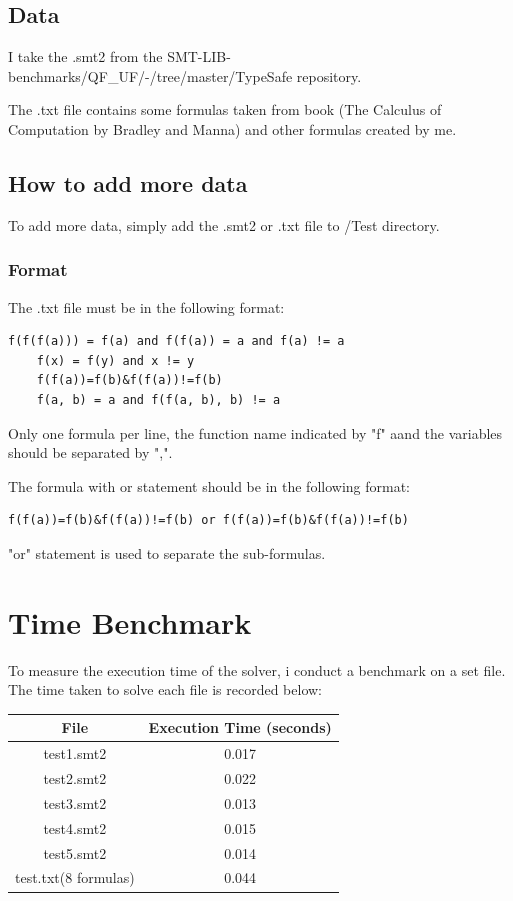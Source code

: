 \documentclass[11pt]{report}
\begin{document}
\subsection*{Data}
I take the .smt2 from the SMT-LIB-benchmarks/QF\_UF/-/tree/master/TypeSafe repository. 

The .txt file contains some formulas taken from book (The Calculus of Computation by Bradley and Manna) and other formulas created by me.

\subsection*{How to add more data}
To add more data, simply add the .smt2 or .txt file to /Test directory.
\subsubsection*{Format}
The .txt file must be in the following format:
\begin{lstlisting}[style=pythoncode]
    f(f(f(a))) = f(a) and f(f(a)) = a and f(a) != a
    f(x) = f(y) and x != y
    f(f(a))=f(b)&f(f(a))!=f(b)
    f(a, b) = a and f(f(a, b), b) != a
\end{lstlisting}
Only one formula per line, the function name indicated by "f" aand the variables should be separated by ",".

The formula with or statement should be in the following format:
\begin{lstlisting}[style=pythoncode]
    f(f(a))=f(b)&f(f(a))!=f(b) or f(f(a))=f(b)&f(f(a))!=f(b)
\end{lstlisting}

"or" statement is used to separate the sub-formulas.



\section*{Time Benchmark}
To measure the execution time of the solver, i conduct a benchmark on a set file. The time taken to solve each file is recorded below:
\begin{center}
\begin{tabular}{|c|c|}
\hline
\textbf{File} & \textbf{Execution Time (seconds)} \\
\hline
test1.smt2 & 0.017 \\
test2.smt2 & 0.022 \\
test3.smt2 & 0.013 \\
test4.smt2 & 0.015 \\
test5.smt2 & 0.014 \\
test.txt(8 formulas) & 0.044 \\

\hline
\end{tabular}
\end{center}
    
\end{document}
